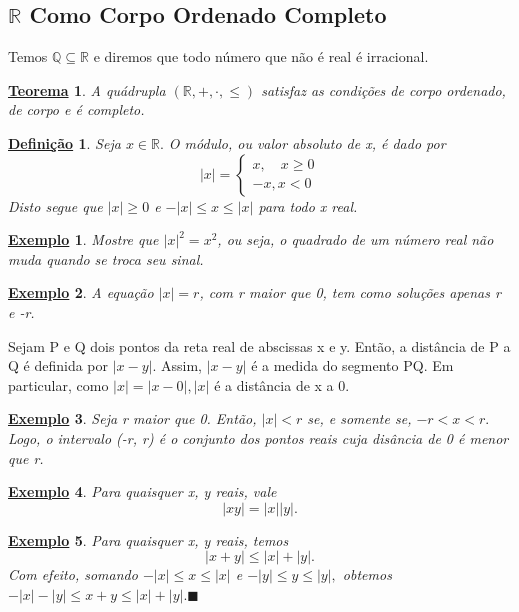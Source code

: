 \documentclass{article}
\newtheorem*{def*}{\underline{Defini\c c\~ao}}
\newtheorem*{theorem*}{\underline{Teorema}}
\newtheorem{example}{\underline{Exemplo}}
\renewcommand\qedsymbol{$\blacksquare$}
\begin{document}
\subsection{$\mathbb{R}$ Como Corpo Ordenado Completo}
  Temos $\mathbb{Q}\subseteq{\mathbb{R}}$ e diremos que todo n\'umero que n\~ao \'e real \'e irracional. 
 \begin{theorem*}
   A qu\'adrupla $(\mathbb{R}, +, \cdot, \leq)$ satisfaz as condi\c c\~oes de corpo ordenado, de corpo e \'e completo.
 \end{theorem*}
\begin{def*}
  Seja $x\in \mathbb{R}.$ O m\'odulo, ou valor absoluto de x, \'e dado por
  $$
    |x| = \left\{\begin{array}{ll}
        x, \quad x \geq 0\\
        -x, x < 0
      \end{array}\right.
  $$
  Disto segue que $|x|\geq 0$ e $-|x|\leq x\leq |x|$ para todo x real.
\end{def*}
\begin{example}
  Mostre que $|x|^2 = x^2$, ou seja, o quadrado de um n\'umero real n\~ao muda quando se troca seu sinal.
\end{example}
\begin{example}
  A equa\c c\~ao $|x| = r$, com r maior que 0, tem como solu\c c\~oes apenas r e -r.
\end{example}
  Sejam P e Q dois pontos da reta real de abscissas x e y. Ent\~ao, a dist\^ancia de P a Q \'e definida por $|x-y|$. Assim,
 $|x-y|$ \'e a medida do segmento PQ. Em particular, como $|x|=|x-0|, |x|$ \'e a dist\^ancia de x a 0.
\begin{example}
  Seja r maior que 0. Ent\~ao, $|x| < r$ se, e somente se, $-r < x < r.$ Logo, o intervalo (-r, r) \'e o conjunto dos pontos reais
cuja dis\^ancia de 0 \'e menor que r.
\end{example}
\begin{example}
  Para quaisquer x, y reais, vale
  $$
    |xy| = |x||y|.
  $$
\end{example}
\begin{example}
  Para quaisquer x, y reais, temos
  $$
    |x+y| \leq |x| + |y|.
  $$
  Com efeito, somando $-|x|\leq{x}\leq{|x|}$ e $-|y|\leq{y}\leq{|y|},$ obtemos $-|x|-|y|\leq{x + y}\leq{|x|+|y|.}$\qedsymbol
\end{example}
\end{document}
